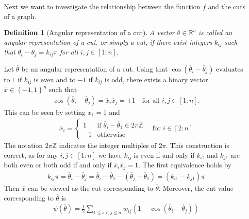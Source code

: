 \documentclass[12pt,a4paper]{article}
\theoremstyle{mythm}
\newtheorem{Def}[thm]{Definition}
\begin{document}
Next we want to investigate the relationship between the function $ f $ and the cuts of a graph.
\begin{Def}[Angular representation of a cut]
  A vector $ \theta \in \mathbb{R} ^{ n }  $ is called an angular representation of a cut, or simply a cut, if there exist integers $ k _{ ij }  $ such that $ \theta_i - \theta_j = k _{ ij }
\pi$ for all $ i,j \in \left[ 1:n \right]  $.
\end{Def} 
Let $ \overline{ \theta }  $ be an angular representation of a cut.
Using that $ \cos( \overline{ \theta }  _{ i } - \overline{ \theta} _{ j }  )  $ evaluates to $ 1 $ if $ k _{ ij }  $ is even and to $ -1 $ if $ k _{ij} $ is odd,
there exists a binary vector $ \overline{ x } \in \left\{ -1,1 \right\} ^{ n }  $  such that
\begin{align}
\label{eq:cutrel} 
\cos( \overline{ \theta } _{ i } - \overline{ \theta }  _{ j } ) = \overline{ x } _{ i } \overline{ x } _{ j } = \pm 1 \quad \text{for all } i,j \in \left[ 1:n \right].
\end{align} 
This can be seen by setting $ x_1 = 1 $ and 
\begin{align*}
\overline{ x }  _{ i } = \begin{cases}
1 & \text{if } \overline{ \theta}_i - \overline{ \theta}_1 \in 2 \pi \mathbb{Z} \\
-1 & \text{otherwise} 
\end{cases}
\quad \text{for } i \in \left[ 2:n \right] 
\end{align*} 
The notation $ 2 \pi \mathbb{Z}  $ indicates the integer multiples of $ 2 \pi  $.
This construction is correct, as for any $ i,j \in \left[ 1:n \right]  $ we have  $ k _{
ij }  $ is even if and only if $ k _{ i1 }  $ and $ k _{ j1 } $ are both even or both odd if and only if $ \overline{ x } _i \overline{ x } _j = 1 $.
The first equivalence holds by
\begin{align*}
 k _{ ij } \pi = \overline{ \theta} _{ i } - \overline{ \theta} _{ j } = \overline{ \theta} _{ i } - \overline{ \theta} _{ 1 } - ( \overline{ \theta} _{ j
} - \overline{ \theta} _{ 1 } ) = ( k _{ i1 } - k _{ j1 } ) \pi 
\end{align*} 
Then $ \overline{ x }  $ can be viewed as the cut corresponding to $ \overline{ \theta }  $.
Moreover, the cut value corresponding to $ \overline{ \theta }  $ is
\begin{align}
\label{eq:psiRelaxedCut} 
\psi ( \overline{ \theta } ) = \frac{ 1 }{ 2 } \sum_{ 1 \leq i < j \leq n  }^{  } w _{ ij } \left( 1 - \cos( \overline{ \theta } _{ i } - \overline{ \theta } _{ j }  )  \right) 
\end{align} 
\end{document}
